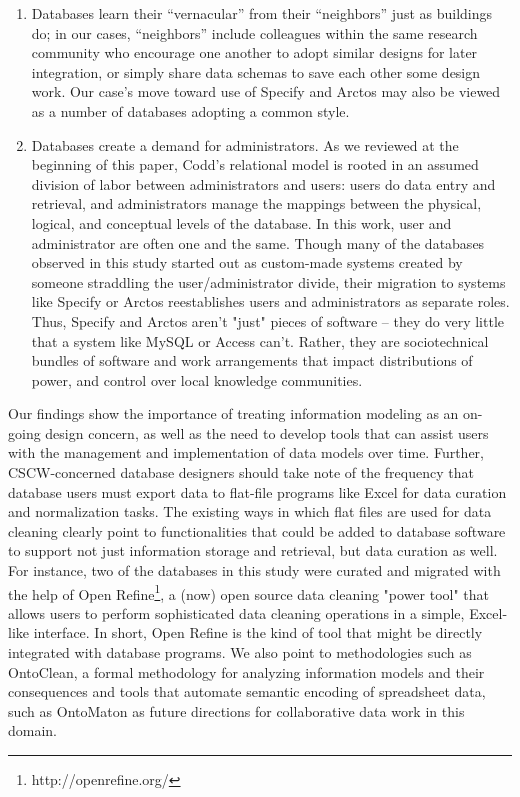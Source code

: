 \begin{enumerate}
\item Databases learn their “vernacular” from their “neighbors” just as buildings do; in our cases, “neighbors” include colleagues within the same research community who encourage one another to adopt similar designs for later integration, or simply share data schemas to save each other some design work. Our case’s move toward use of Specify and Arctos may also be viewed as a number of databases adopting a common style. 
\item Databases create a demand for administrators. As we reviewed at the beginning of this paper, Codd’s relational model is rooted in an assumed division of labor between administrators and users: users do data entry and retrieval, and administrators manage the mappings between the physical, logical, and conceptual levels of the database. In this work, user and administrator are often one and the same. Though many of the databases observed in this study started out as custom-made systems created by someone straddling the user/administrator divide, their migration to systems like Specify or Arctos reestablishes users and administrators as separate roles. Thus, Specify and Arctos aren't "just" pieces of software -- they do very little that a system like MySQL or Access can't. Rather, they are sociotechnical bundles of software and work arrangements that impact distributions of power, and control over local knowledge communities.
\end{enumerate}

Our findings show the importance of treating information modeling as an on-going design concern, as well as the need to develop tools that can assist users with the management and implementation of data models over time. Further, CSCW-concerned database designers should take note of the frequency that database users must export data to flat-file programs like Excel for data curation and normalization tasks. The existing ways in which flat files are used for data cleaning clearly point to functionalities that could be added to database software to support not just information storage and retrieval, but data curation as well.  For instance, two of the databases in this study were curated and migrated with the help of Open Refine\footnote{http://openrefine.org/}, a (now) open source data cleaning "power tool" that allows users to perform sophisticated data cleaning operations in a simple, Excel-like interface.  In short, Open Refine is the kind of tool that might be directly integrated with database programs. We also point to methodologies such as OntoClean, a formal methodology for analyzing information models and their consequences \cite{Guarino_2004} and tools that automate semantic encoding of spreadsheet data, such as OntoMaton \cite{Maguire_2012} as future directions for collaborative data work in this domain. 
